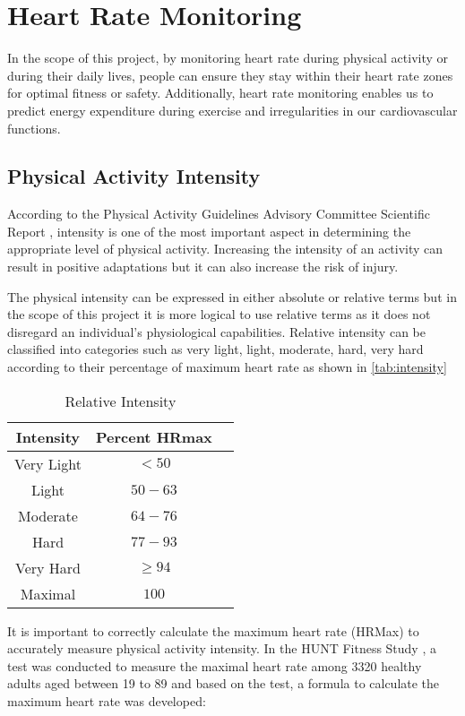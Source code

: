 \section{Heart Rate Monitoring}
In the scope of this project, by monitoring heart rate during physical activity or during their daily lives, people can ensure they stay within their heart rate zones for optimal fitness or safety.
Additionally, heart rate monitoring enables us to predict energy expenditure during exercise and irregularities in our cardiovascular functions.

\subsection{Physical Activity Intensity}
\label{chap:activity_intensity}
According to the Physical Activity Guidelines Advisory Committee Scientific Report \autocite{healthgov2008}, intensity is one of the most important aspect in determining the appropriate level of physical activity.
Increasing the intensity of an activity can result in positive adaptations but it can also increase the risk of injury. 

The physical intensity can be expressed in either absolute or relative terms but in the scope of this project it is more logical to use relative terms as it does not disregard an individual's physiological capabilities. 
Relative intensity can be classified into categories such as very light, light, moderate, hard, very hard according to their percentage of maximum heart rate as shown in \autoref{tab:intensity} \autocite{healthgov2008}

\begin{table}[htbp]
    \centering
    \begin{tabular}{|c|c|c|}
      \hline
      \textbf{Intensity} & \textbf{Percent HRmax} \\
      \hline
      Very Light & $<50$ \\
      Light & $50-63$ \\
      Moderate & $64-76$ \\
      Hard & $77-93$ \\
      Very Hard & $\geq94$ \\
      Maximal & $100$ \\
      \hline
    \end{tabular}
    \caption{Relative Intensity \autocite{healthgov2008}}
    \label{tab:intensity}
  \end{table}
  
It is important to correctly calculate the maximum heart rate (HRMax) to accurately measure physical activity intensity. In the HUNT Fitness Study \autocite{nes2013maximal}, a test was conducted to measure the maximal heart rate among 3320 healthy adults aged between 19 to 89 and based on the test, a formula to calculate the maximum heart rate was developed: 

